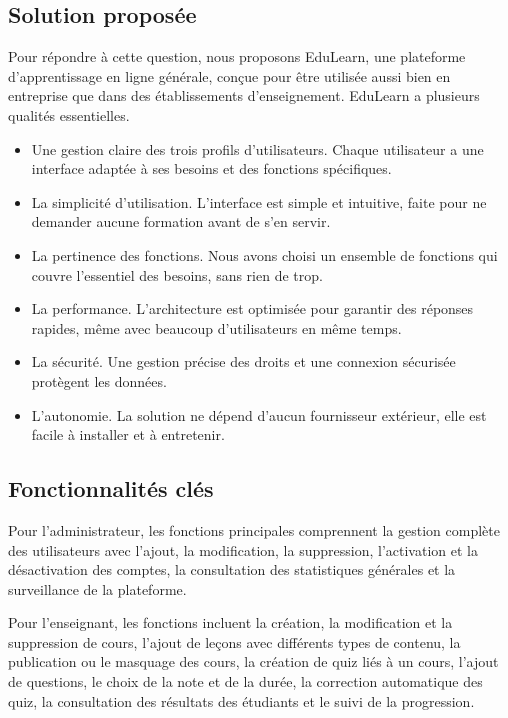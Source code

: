 \documentclass[12pt,a4paper]{report}
\begin{document}
\subsection{Solution proposée}
Pour répondre à cette question, nous proposons EduLearn, une plateforme d'apprentissage en ligne générale, conçue pour être utilisée aussi bien en entreprise que dans des établissements d'enseignement. EduLearn a plusieurs qualités essentielles.

\begin{itemize}
    \item Une gestion claire des trois profils d'utilisateurs. Chaque utilisateur a une interface adaptée à ses besoins et des fonctions spécifiques.
    \item La simplicité d'utilisation. L'interface est simple et intuitive, faite pour ne demander aucune formation avant de s'en servir.
    \item La pertinence des fonctions. Nous avons choisi un ensemble de fonctions qui couvre l'essentiel des besoins, sans rien de trop.
    \item La performance. L'architecture est optimisée pour garantir des réponses rapides, même avec beaucoup d'utilisateurs en même temps.
    \item La sécurité. Une gestion précise des droits et une connexion sécurisée protègent les données.
    \item L'autonomie. La solution ne dépend d'aucun fournisseur extérieur, elle est facile à installer et à entretenir.
\end{itemize}

\subsection{Fonctionnalités clés}
Pour l'administrateur, les fonctions principales comprennent la gestion complète des utilisateurs avec l'ajout, la modification, la suppression, l'activation et la désactivation des comptes, la consultation des statistiques générales et la surveillance de la plateforme.

Pour l'enseignant, les fonctions incluent la création, la modification et la suppression de cours, l'ajout de leçons avec différents types de contenu, la publication ou le masquage des cours, la création de quiz liés à un cours, l'ajout de questions, le choix de la note et de la durée, la correction automatique des quiz, la consultation des résultats des étudiants et le suivi de la progression.
\end{document}
